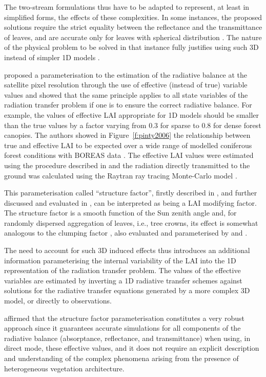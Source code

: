 The two-stream formulations thus have to be adapted to represent, at least in simplified forms, the effects of these complexities. In some instances, the proposed solutions require the strict equality between the reflectance and the transmittance of leaves, and are accurate only for leaves with spherical distribution \citep{Sellers1985}. The nature of the physical problem to be solved in that instance fully justifies using such 3D instead of simpler 1D models \citep{Knyazikhin1998a,Widlowski2001,pinty2006}.

\citet{Pinty2004} proposed a parameterisation to the estimation of the radiative balance at the satellite pixel resolution through the use of effective (instead of true) variable values and showed that the same principle applies to all state variables of the radiation transfer problem if one is to ensure the correct radiative balance. For example, the values of effective LAI appropriate for 1D models should be smaller than the true values by a factor varying from 0.3 for sparse to 0.8 for dense forest canopies. The authors showed in Figure~\ref{f:pinty2006} the relationship between true and effective LAI to be expected over a wide range of modelled coniferous forest conditions with BOREAS data \citep{Widlowski2004}. The effective LAI values were estimated using the procedure described in \citep{Pinty2004} and the radiation directly transmitted to the ground was calculated using the Raytran ray tracing Monte-Carlo model \citep{Govaerts1998}.

This parameterisation called ``structure factor'', firstly described in \citep{Pinty2004}, and further discussed and evaluated in \citep{pinty2006}, can be interpreted as being a LAI modifying factor. The structure factor is a smooth function of the Sun zenith angle and, for randomly dispersed aggregation of leaves, i.e., tree crowns, its effect is somewhat analogous to the clumping factor \citep{Nilson1971}, also evaluated and parameterised by \citet{Kucharik1999} and \citet{Ni-Meister2010}.

The need to account for such 3D induced effects thus introduces an additional information parameterising the internal variability of the LAI into the 1D representation of the radiation transfer problem. The values of the effective variables are estimated by inverting a 1D radiative transfer schemes against solutions for the radiative transfer equations generated by a more complex 3D model, or directly to observations. 

\citet{pinty2006} affirmed that the structure factor parameterisation constitutes a very robust approach since it guarantees accurate simulations for all components of the radiative balance (absorptance, reflectance, and transmittance) when using, in direct mode, these effective values, and it does not require an explicit description and understanding of the complex phenomena arising from the presence of heterogeneous vegetation architecture. 

